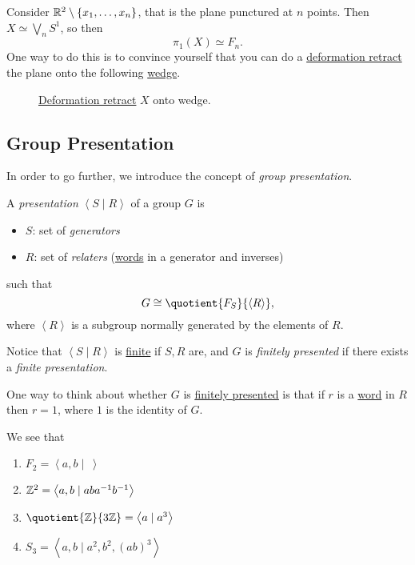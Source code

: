 \begin{exercise}
	Consider \(\mathbb{\MakeUppercase{r}} ^2 \setminus \{x_1, \ldots , x_n \}\), that is the plane punctured at \(n\) points. Then \(X \simeq \bigvee_n S^1\), so then
	\[
		\pi _1(X)\simeq F_n.
	\]
	One way to do this is to convince yourself that you can do a \hyperref[def:deformation-retraction]{deformation retract} the plane onto the following \hyperref[sssec:Wedge-sum]{wedge}.
	\begin{figure}[H]
		\centering
		\caption{\hyperref[def:deformation-retraction]{Deformation retract} \(X\) onto wedge.}
		\label{fig:lec11:ex}
	\end{figure}
\end{exercise}

\subsection{Group Presentation}
In order to go further, we introduce the concept of \emph{group presentation}.
\begin{definition}\label{def:group-presentation}
	A \emph{presentation} \(\left< S \mid R \right> \) of a group \(G\) is
	\begin{itemize}
		\item \(S\): set of \emph{generators}
		\item \(R\): set of \emph{relaters} (\hyperref[def:word]{words} in a generator and inverses)
	\end{itemize}
	such that
	\[
		G\cong \quotient{F_S}{\left< R \right>},
	\]
	where \(\left< R \right> \) is a subgroup normally generated by the elements of \(R\).

	\par Notice that \(\left< S \mid R \right> \) is \underline{finite} if \(S, R\) are, and \(G\) is \emph{finitely presented} if
	there exists a \emph{finite presentation}.
\end{definition}

\begin{note}
	One way to think about whether \(G\) is \hyperref[def:group-presentation]{\underline{finitely presented}} is that if \(r\) is a
	\hyperref[def:word]{word} in \(R\) then \(r = 1\), where \(1\) is the identity of \(G\).
\end{note}

\begin{eg}
	We see that
	\begin{enumerate}
		\item \(F_2 = \left< a, b \mid\ \right> \)
		\item \(\mathbb{\MakeUppercase{z}} ^2 = \left< a, b \mid aba^{-1} b^{-1}  \right> \)
		\item \(\quotient{\mathbb{\MakeUppercase{z}}}{3\mathbb{\MakeUppercase{z}}} = \left< a \mid a^3 \right> \)
		\item \(S_3 = \left< a, b \mid a^2, b^2, (ab)^3 \right> \)
	\end{enumerate}
\end{eg}

